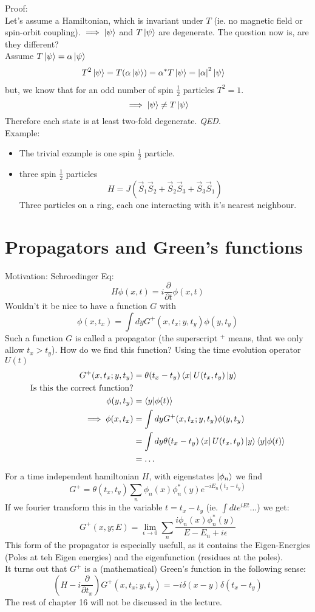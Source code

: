 \documentclass{report}
\begin{document}
Proof:\\
Let's assume a Hamiltonian, which is invariant under  $T$ (ie. no magnetic field or spin-orbit coupling). $\implies \ket{\psi }$ and $T \ket{\psi }$ are degenerate. The question now is, are they different?\\
Assume $T \ket{ \psi } = \alpha \ket{\psi }$ 
\begin{align*}
	T^2 \ket{\psi } = T(\alpha \ket{ \psi }) &= \alpha^* T \ket{\psi } = \abs{\alpha}^2 \ket{\psi }
\end{align*}
but, we know that for an odd number of spin $\frac{1}{2}$ particles $T^2 = 1$. \[
\implies \ket{ \psi } \neq T \ket{\psi }
\] Therefore each state is at least two-fold degenerate. \emph{QED}.\\
Example:
\begin{itemize}
	\item The trivial example is one spin $\frac{1}{2}$ particle.
	\item three spin $\frac{1}{2}$ particles \[
			H = J\left( \vec{S}_1 \vec{S}_2 + \vec{S}_2 \vec{S}_3 + \vec{S}_3 \vec{S}_1 \right) 
	\] Three particles on a ring, each one interacting with it's nearest neighbour. 
\end{itemize}
\chapter{Propagators and Green's functions}
Motivation: Schroedinger Eq:\[
	H \phi(x,t) = i \frac{\partial }{\partial t} \phi(x,t) 
\] Wouldn't it be nice to have a function $G$ with \[
\phi(x,t_x) = \int dy G^+(x, t_x; y, t_y) \phi(y,t_y)
\] Such a function $G$ is called a propagator (the superscript $^+$ means, that we only allow $t_x > t_y$). How do we find this function? Using the time evolution operator $U(t)$
\begin{align*}
	G^+(x,t_x; y, t_y) &= \theta(t_x - t_y) \bra{x} U(t_x, t_y) \ket{y} \\
        \text{Is this the correct function?}\\
	\phi(y, t_y) &= \bra{y} \ket{\phi(t)}\\
	\implies \phi(x, t_x) &= \int dy G^+(x,t_x;y,t_y) \phi(y, t_y) \\
			      &= \int dy \theta(t_x - t_y) \bra{x} U(t_x, t_y) \ket{y}\bra{y}\ket{\phi(t)} \\
			      &= \ldots \\
\end{align*}
For a time independent hamiltonian $H$, with eigenstates $\ket{\phi_n}$ we find \[
	G^+ = \theta(t_x, t_y) \sum_{n} \phi_n(x) \phi^*_n(y) e^{-i E_n\left( t_x - t_y \right) }
\] If we fourier transform this in the variable $t = t_x - t_y$ (ie. $\int dt e^{iEt} \ldots$) we get: \[
G^+(x,y; E) = \lim_{\epsilon \to 0}  \sum_{n} \frac{i \phi_n(x) \phi^*_n(y)}{E-E_n + i \epsilon}
\]  This form of the propagator is especially usefull, as it contains the Eigen-Energies (Poles at teh Eigen energies) and the eigenfunction (residues at the poles).\\
It turns out that $G^+$ is a (mathematical) Green's function in the following sense: \[
(H-i \frac{\partial }{\partial t_x} ) G^+(x,t_x;y,t_y) = -i \delta(x-y) \delta(t_x - t_y)
\] The rest of chapter 16 will not be discussed in the lecture.
\end{document}
